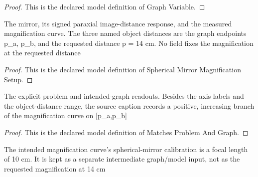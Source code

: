 \begin{proof}
  This is the declared model definition of Graph Variable.
\end{proof}
\begin{definition}
  \label{def:physics:phyx-mini-0160:phyxminiproblems-problemphyxmini0160-sphericalmirrormagnificationsetup}
  The mirror, its signed paraxial image-distance response, and the measured magnification curve. The three named object distances are the graph endpoints p\_a, p\_b, and the requested distance p = 14 cm. No field fixes the magnification at the requested distance
\end{definition}
\begin{proof}
  This is the declared model definition of Spherical Mirror Magnification Setup.
\end{proof}
\begin{definition}
  \label{def:physics:phyx-mini-0160:phyxminiproblems-problemphyxmini0160-matchesproblemandgraph}
  The explicit problem and intended-graph readouts. Besides the axis labels and the object-distance range, the source caption records a positive, increasing branch of the magnification curve on [p\_a,p\_b]
\end{definition}
\begin{proof}
  This is the declared model definition of Matches Problem And Graph.
\end{proof}
\begin{definition}
  \label{def:physics:phyx-mini-0160:phyxminiproblems-problemphyxmini0160-hasfigurederivedfocalcalibration}
  The intended magnification curve's spherical-mirror calibration is a focal length of 10 cm. It is kept as a separate intermediate graph/model input, not as the requested magnification at 14 cm
\end{definition}
